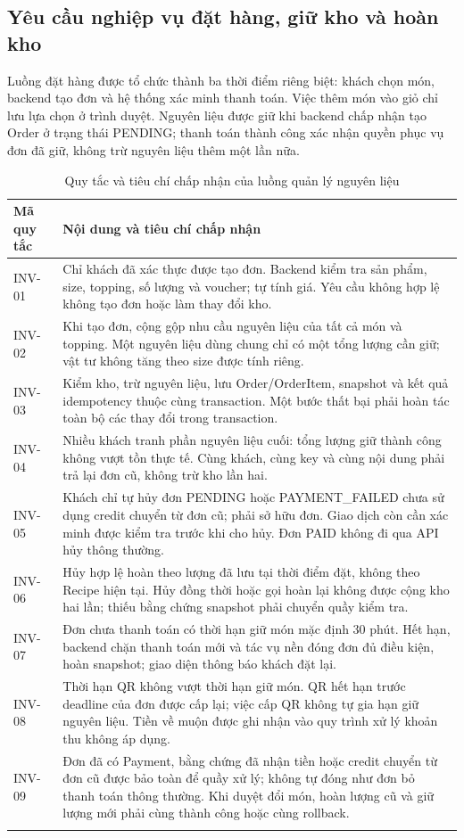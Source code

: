 \subsection{Yêu cầu nghiệp vụ đặt hàng, giữ kho và hoàn kho}
\label{sec:inventory-requirements}
Luồng đặt hàng được tổ chức thành ba thời điểm riêng biệt: khách chọn món, backend tạo đơn và hệ thống xác minh thanh toán. Việc thêm món vào giỏ chỉ lưu lựa chọn ở trình duyệt. Nguyên liệu được giữ khi backend chấp nhận tạo Order ở trạng thái PENDING; thanh toán thành công xác nhận quyền phục vụ đơn đã giữ, không trừ nguyên liệu thêm một lần nữa.

\begin{longtable}{|p{.12\linewidth}|p{.79\linewidth}|}
\hline\textbf{Mã quy tắc} & \textbf{Nội dung và tiêu chí chấp nhận}\\\hline\endhead
INV-01 & Chỉ khách đã xác thực được tạo đơn. Backend kiểm tra sản phẩm, size, topping, số lượng và voucher; tự tính giá. Yêu cầu không hợp lệ không tạo đơn hoặc làm thay đổi kho.\\\hline
INV-02 & Khi tạo đơn, cộng gộp nhu cầu nguyên liệu của tất cả món và topping. Một nguyên liệu dùng chung chỉ có một tổng lượng cần giữ; vật tư không tăng theo size được tính riêng.\\\hline
INV-03 & Kiểm kho, trừ nguyên liệu, lưu Order/OrderItem, snapshot và kết quả idempotency thuộc cùng transaction. Một bước thất bại phải hoàn tác toàn bộ các thay đổi trong transaction.\\\hline
INV-04 & Nhiều khách tranh phần nguyên liệu cuối: tổng lượng giữ thành công không vượt tồn thực tế. Cùng khách, cùng key và cùng nội dung phải trả lại đơn cũ, không trừ kho lần hai.\\\hline
INV-05 & Khách chỉ tự hủy đơn PENDING hoặc PAYMENT\_FAILED chưa sử dụng credit chuyển từ đơn cũ; phải sở hữu đơn. Giao dịch còn cần xác minh được kiểm tra trước khi cho hủy. Đơn PAID không đi qua API hủy thông thường.\\\hline
INV-06 & Hủy hợp lệ hoàn theo lượng đã lưu tại thời điểm đặt, không theo Recipe hiện tại. Hủy đồng thời hoặc gọi hoàn lại không được cộng kho hai lần; thiếu bằng chứng snapshot phải chuyển quầy kiểm tra.\\\hline
INV-07 & Đơn chưa thanh toán có thời hạn giữ món mặc định 30 phút. Hết hạn, backend chặn thanh toán mới và tác vụ nền đóng đơn đủ điều kiện, hoàn snapshot; giao diện thông báo khách đặt lại.\\\hline
INV-08 & Thời hạn QR không vượt thời hạn giữ món. QR hết hạn trước deadline của đơn được cấp lại; việc cấp QR không tự gia hạn giữ nguyên liệu. Tiền về muộn được ghi nhận vào quy trình xử lý khoản thu không áp dụng.\\\hline
INV-09 & Đơn đã có Payment, bằng chứng đã nhận tiền hoặc credit chuyển từ đơn cũ được bảo toàn để quầy xử lý; không tự đóng như đơn bỏ thanh toán thông thường. Khi duyệt đổi món, hoàn lượng cũ và giữ lượng mới phải cùng thành công hoặc cùng rollback.\\\hline
\caption{Quy tắc và tiêu chí chấp nhận của luồng quản lý nguyên liệu}
\end{longtable}

